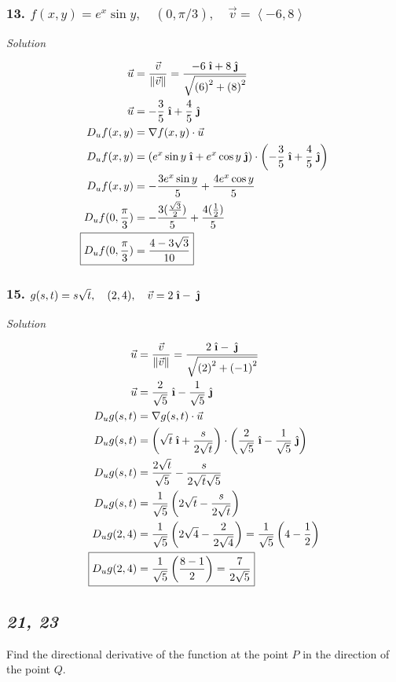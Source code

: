 \documentclass{article}
\newcommand{\ihat}{\;\hat{\textbf{\i}}}
\newcommand{\jhat}{\;\hat{\textbf{\j}}}
\newcommand\vv[1]{\left\langle #1 \right\rangle}
\newcommand\mgv[1]{\|#1\|}
\newcommand\mgvv[2]{\sqrt{\left(#1\right)^2 + \left(#2\right)^2}}
\newcommand{\solution}{\centerline{\textit{Solution}}}
\newcommand{\bp}[1]{\left(#1\right)}
\begin{document}
\subsubsection*{13. $f(x,y)=e^x\sin y,\quad (0,\pi /3),\quad \vec v = \vv{-6, 8}$}
\solution 
\begin{align*}
    \vec u &= \displaystyle\frac{\vec v}{\mgv{\vec v}} = \displaystyle\frac{-6\ihat+8\jhat}{\mgvv{6}{8}} \\
    \vec u &= -\frac {3}{5}\ihat + \frac 4 5\jhat \\
    D_u f(x,y) &= \nabla f(x,y) \cdot \vec u \\
    D_u f(x,y) &= \bp{e^x\sin y\ihat + e^x\cos y\jhat} \cdot \bp{-\frac 3 5\ihat
    + \frac 4 5 \jhat}\\
    D_u f(x,y) &= -\displaystyle\frac{3e^x\sin y}{5} +
    \displaystyle\frac{4e^x\cos y}{5}\\
    D_u f(0,\frac \pi 3) &= -\displaystyle\frac{3(\frac {\sqrt 3} 2)}{5} +
    \displaystyle\frac{4(\frac 1 2)}{5}\\
    \Aboxed{D_u f(0,\frac \pi 3) &= \displaystyle\frac{4-3\sqrt 3}{10}}\\
\end{align*}
\subsubsection*{15. $g(s,t)= s\sqrt t,\quad(2,4),\quad \vec v = 2\ihat - \jhat$}
\solution 
\begin{align*}
    \vec u &= \frac{\vec v}{\mgv{\vec v}} = \frac{2\ihat-\jhat}{\mgvv{2}{-1}} \\ 
    \vec u &= \frac 2 {\sqrt 5}\ihat - \frac 1 {\sqrt 5}\jhat \\
    D_u g(s,t) &= \nabla g(s,t) \cdot \vec u \\
    D_u g(s,t) &= \bp{\sqrt t\ihat + \frac{s}{2\sqrt t}}\cdot\bp{\frac 2 {\sqrt 5}\ihat - \frac 1 {\sqrt 5}\jhat} \\
    D_u g(s,t) &= \displaystyle\frac{2\sqrt t}{\sqrt 5} -
    \displaystyle\frac{s}{2\sqrt t \sqrt 5} \\
    D_u g(s,t) &= \frac 1 {\sqrt 5} \bp{2\sqrt t - \frac s {2\sqrt t}} \\
    D_u g(2,4) &= \frac1 {\sqrt 5}\bp{2\sqrt 4 - \frac 2 {2\sqrt 4}} = \frac 1
    {\sqrt 5}\bp{4 - \frac 1 2} \\
    \Aboxed{D_u g(2,4) &= \frac 1 {\sqrt 5} \bp{\frac {8-1}{2}} = \frac 7 {2\sqrt 5}}
\end{align*}
\newpage
\begin{center}
    \subsection*{\textit{21, 23}} 
    Find the directional derivative of the function at the point $P$ in the
    direction of the point $Q$.
\end{center}
\end{document}
